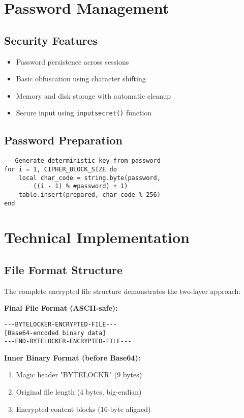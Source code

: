\documentclass[11pt,a4paper]{article}
\begin{document}
\begin{multicols}{2}
\section{Password Management}

\subsection{Security Features}
\begin{itemize}
    \item Password persistence across sessions
    \item Basic obfuscation using character shifting
    \item Memory and disk storage with automatic cleanup
    \item Secure input using \texttt{inputsecret()} function
\end{itemize}

\subsection{Password Preparation}
\begin{lstlisting}[basicstyle=\ttfamily\tiny]
-- Generate deterministic key from password
for i = 1, CIPHER_BLOCK_SIZE do
    local char_code = string.byte(password, 
        ((i - 1) % #password) + 1)
    table.insert(prepared, char_code % 256)
end
\end{lstlisting}

\section{Technical Implementation}

\subsection{File Format Structure}
The complete encrypted file structure demonstrates the two-layer approach:

\textbf{Final File Format (ASCII-safe):}
\begin{lstlisting}[basicstyle=\ttfamily\tiny]
---BYTELOCKER-ENCRYPTED-FILE---
[Base64-encoded binary data]
---END-BYTELOCKER-ENCRYPTED-FILE---
\end{lstlisting}

\textbf{Inner Binary Format (before Base64):}
\begin{enumerate}
    \item Magic header "BYTELOCKR" (9 bytes)
    \item Original file length (4 bytes, big-endian)
    \item Encrypted content blocks (16-byte aligned)
\end{enumerate}


\end{multicols}
\end{document}
